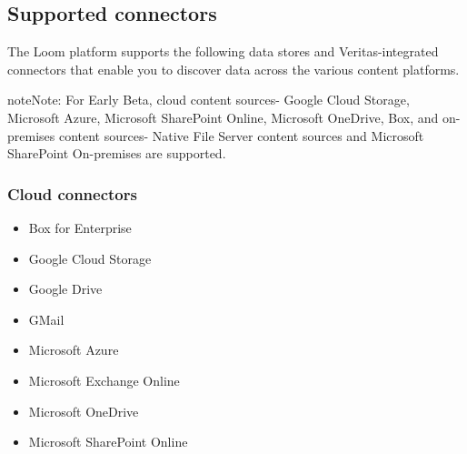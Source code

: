 \documentclass[letterpaper,10pt,english]{sphinxmanual}
\begin{document}
\subsection{Supported connectors}
\label{\detokenize{mcdmp_app_ug:supported-connectors}}
The Loom platform supports the following data stores and Veritas-integrated connectors that enable you to discover data across the various content platforms.

\begin{sphinxadmonition}{note}{Note:}
For Early Beta, cloud content sources- Google Cloud Storage, Microsoft Azure, Microsoft SharePoint Online, Microsoft OneDrive, Box, and on-premises content sources- Native File Server content sources and Microsoft SharePoint On-premises are supported.
\end{sphinxadmonition}


\subsubsection{Cloud connectors}
\label{\detokenize{mcdmp_app_ug:cloud-connectors}}\begin{itemize}
\item {} 
Box for Enterprise

\item {} 
Google Cloud Storage

\item {} 
Google Drive

\item {} 
GMail

\item {} 
Microsoft Azure

\item {} 
Microsoft Exchange Online

\item {} 
Microsoft OneDrive

\item {} 
Microsoft SharePoint Online

\end{itemize}
\end{document}
